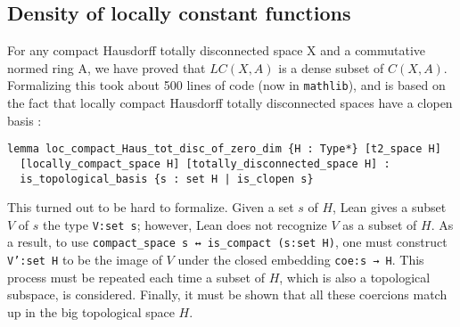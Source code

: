 \documentclass[a4paper,UKenglish,cleveref, autoref, thm-restate,pdfa]{lipics-v2021}
\newcommand{\lean}[1]{\texttt{#1}\xspace} %
\begin{document}
\subsection{Density of locally constant functions}
For any compact Hausdorff totally disconnected space X and a commutative
normed ring A, we have proved that $LC(X, A)$ is a dense subset of $C(X, A)$. 
Formalizing this took about 500 lines of code (now in \lean{mathlib}), and is based on the fact that locally compact Hausdorff
totally disconnected spaces have a clopen basis :
\begin{lstlisting}
lemma loc_compact_Haus_tot_disc_of_zero_dim {H : Type*} [t2_space H] 
  [locally_compact_space H] [totally_disconnected_space H] : 
  is_topological_basis {s : set H | is_clopen s}
\end{lstlisting}
This turned out to be hard to formalize. Given a set $s$ of $H$, Lean gives a subset $V$ of $s$ 
the type \lean{V:set s}; however, Lean does not recognize $V$ as a subset of $H$. As a result, 
to use \lean{compact\_space s ↔ is\_compact (s:set H)}, one must construct \lean{V':set H} 
to be the image of $V$ under the closed embedding \lean{coe:s → H}. This process must be repeated each time a subset of $H$, 
which is also a topological subspace, is considered. Finally, it must be shown that all these coercions match up in the big 
topological space $H$.
\end{document}
